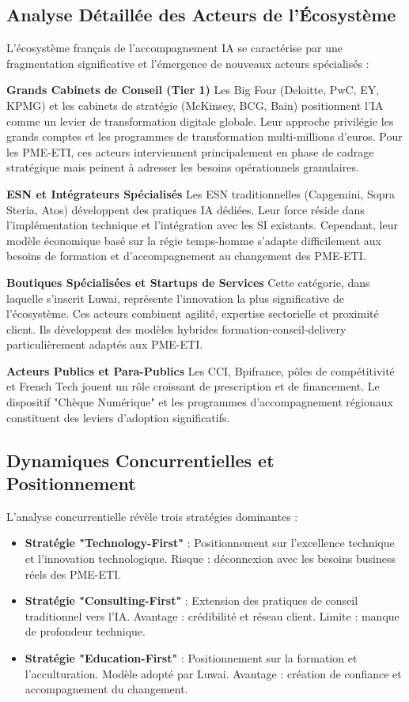 \subsection{Analyse Détaillée des Acteurs de l'Écosystème}

L'écosystème français de l'accompagnement IA se caractérise par une fragmentation significative et l'émergence de nouveaux acteurs spécialisés :

\textbf{Grands Cabinets de Conseil (Tier 1)}
Les Big Four (Deloitte, PwC, EY, KPMG) et les cabinets de stratégie (McKinsey, BCG, Bain) positionnent l'IA comme un levier de transformation digitale globale. Leur approche privilégie les grands comptes et les programmes de transformation multi-millions d'euros. Pour les PME-ETI, ces acteurs interviennent principalement en phase de cadrage stratégique mais peinent à adresser les besoins opérationnels granulaires.

\textbf{ESN et Intégrateurs Spécialisés}
Les ESN traditionnelles (Capgemini, Sopra Steria, Atos) développent des pratiques IA dédiées. Leur force réside dans l'implémentation technique et l'intégration avec les SI existants. Cependant, leur modèle économique basé sur la régie temps-homme s'adapte difficilement aux besoins de formation et d'accompagnement au changement des PME-ETI.

\textbf{Boutiques Spécialisées et Startups de Services}
Cette catégorie, dans laquelle s'inscrit Luwai, représente l'innovation la plus significative de l'écosystème. Ces acteurs combinent agilité, expertise sectorielle et proximité client. Ils développent des modèles hybrides formation-conseil-delivery particulièrement adaptés aux PME-ETI.

\textbf{Acteurs Publics et Para-Publics}
Les CCI, Bpifrance, pôles de compétitivité et French Tech jouent un rôle croissant de prescription et de financement. Le dispositif "Chèque Numérique" et les programmes d'accompagnement régionaux constituent des leviers d'adoption significatifs.

\subsection{Dynamiques Concurrentielles et Positionnement}

L'analyse concurrentielle révèle trois stratégies dominantes :

\begin{itemize}
    \item \textbf{Stratégie "Technology-First"} : Positionnement sur l'excellence technique et l'innovation technologique. Risque : déconnexion avec les besoins business réels des PME-ETI.
    \item \textbf{Stratégie "Consulting-First"} : Extension des pratiques de conseil traditionnel vers l'IA. Avantage : crédibilité et réseau client. Limite : manque de profondeur technique.
    \item \textbf{Stratégie "Education-First"} : Positionnement sur la formation et l'acculturation. Modèle adopté par Luwai. Avantage : création de confiance et accompagnement du changement.
\end{itemize}

